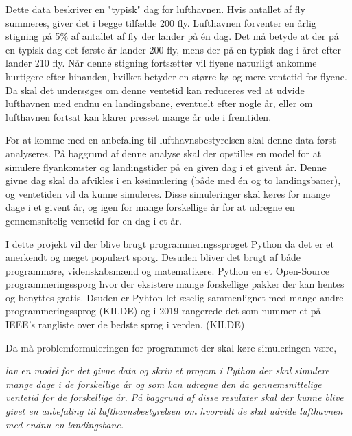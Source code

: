 Dette data beskriver en "typisk" dag for lufthavnen. Hvis antallet af fly summeres, giver det i begge tilfælde 200 fly. Lufthavnen forventer en årlig stigning på 5\% af antallet af fly der lander på én dag. Det må betyde at der på en typisk dag det første år lander 200 fly, mens der på en typisk dag i året efter lander 210 fly. Når denne stigning fortsætter vil flyene naturligt ankomme hurtigere efter hinanden, hvilket betyder en større kø og mere ventetid for flyene. Da skal det undersøges om denne ventetid kan reduceres ved at udvide lufthavnen med endnu en landingsbane, eventuelt efter nogle år, eller om lufthavnen fortsat kan klarer presset mange år ude i fremtiden.

For at komme med en anbefaling til lufthavnsbestyrelsen skal denne data først analyseres. På baggrund af denne analyse skal der opstilles en model for at simulere flyankomster og landingstider på en given dag i et givent år.
Denne givne dag skal da afvikles i en køsimulering (både med én og to landingsbaner), og ventetiden vil da kunne simuleres.
Disse simuleringer skal køres for mange dage i et givent år, og igen for mange forskellige år for at udregne en gennemsnitelig ventetid for en dag i et år.

I dette projekt vil der blive brugt programmeringssproget Python da det er et anerkendt og meget populært sporg. Desuden bliver det brugt af både programmøre, videnskabsmænd og matematikere. Python en et Open-Source programmeringssporg hvor der eksistere mange forskellige pakker der kan hentes og benyttes gratis. Dsuden er Pyhton letlæselig sammenlignet med mange andre programmeringssprog (KILDE) og i 2019 rangerede det som nummer et på \textsc{IEEE}'s rangliste over de bedste sprog i verden. (KILDE)

Da må problemformuleringen for programmet der skal køre simuleringen være,

\begin{center}
	\textit{lav en model for det givne data og skriv et progam i Python der skal simulere mange dage i de forskellige år og som kan udregne den da gennemsnittelige ventetid for de forskellige år.
	På baggrund af disse resulater skal der kunne blive givet en anbefaling til lufthavnsbestyrelsen om hvorvidt de skal udvide lufthavnen med endnu en landingsbane.}
\end{center}
